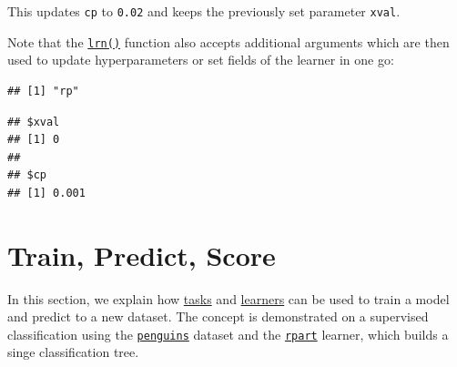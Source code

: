 \documentclass[
]{scrbook}
\newenvironment{Shaded}{\begin{snugshade}}{\end{snugshade}}
\newcommand{\AttributeTok}[1]{\textcolor[rgb]{0.77,0.63,0.00}{#1}}
\newcommand{\FloatTok}[1]{\textcolor[rgb]{0.00,0.00,0.81}{#1}}
\newcommand{\FunctionTok}[1]{\textcolor[rgb]{0.00,0.00,0.00}{#1}}
\newcommand{\NormalTok}[1]{#1}
\newcommand{\OtherTok}[1]{\textcolor[rgb]{0.56,0.35,0.01}{#1}}
\newcommand{\SpecialCharTok}[1]{\textcolor[rgb]{0.00,0.00,0.00}{#1}}
\newcommand{\StringTok}[1]{\textcolor[rgb]{0.31,0.60,0.02}{#1}}
\renewenvironment{Shaded} {\begin{snugshade}\small} {\end{snugshade}}
\begin{document}
\begin{Shaded}
\end{Shaded}

This updates \texttt{cp} to \texttt{0.02} and keeps the previously set parameter \texttt{xval}.

Note that the \href{https://mlr3.mlr-org.com/reference/mlr_sugar.html}{\texttt{lrn()}} function also accepts additional arguments which are then used to update hyperparameters or set fields of the learner in one go:

\begin{Shaded}
\end{Shaded}

\begin{verbatim}
## [1] "rp"
\end{verbatim}

\begin{Shaded}
\end{Shaded}

\begin{verbatim}
## $xval
## [1] 0
## 
## $cp
## [1] 0.001
\end{verbatim}

\hypertarget{train-predict}{%
\section{Train, Predict, Score}\label{train-predict}}

In this section, we explain how \protect\hyperlink{tasks}{tasks} and \protect\hyperlink{learners}{learners} can be used to train a model and predict to a new dataset.
The concept is demonstrated on a supervised classification using the \href{https://mlr3.mlr-org.com/reference/mlr_tasks_penguins.html}{\texttt{penguins}} dataset and the \href{https://mlr3.mlr-org.com/reference/mlr_learners_classif.rpart.html}{\texttt{rpart}} learner, which builds a singe classification tree.
\end{document}
